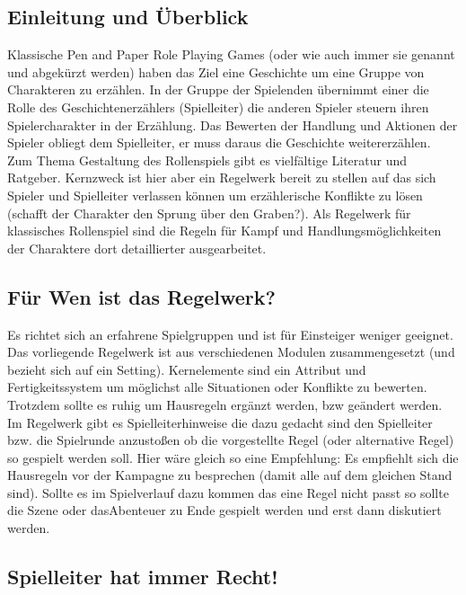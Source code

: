 \documentclass{article}
\begin{document}
\tableofcontents
\newpage
\begin{center}
\section{Einleitung und Überblick}
\end{center}

Klassische Pen and Paper Role Playing Games (oder wie auch immer sie genannt und abgekürzt werden) haben das Ziel
eine Geschichte um eine Gruppe von Charakteren zu erzählen. In der Gruppe der Spielenden übernimmt einer die Rolle
des Geschichtenerzählers (Spielleiter) die anderen Spieler steuern ihren Spielercharakter in der Erzählung. Das
Bewerten der Handlung und Aktionen der Spieler obliegt dem Spielleiter, er muss daraus die Geschichte weitererzählen.
Zum Thema Gestaltung des Rollenspiels gibt es vielfältige Literatur und Ratgeber. Kernzweck ist hier aber
ein Regelwerk bereit zu stellen auf das sich Spieler und Spielleiter verlassen können um erzählerische Konflikte zu
lösen (schafft der Charakter den Sprung über den Graben?). Als Regelwerk für klassisches Rollenspiel sind die Regeln
für Kampf und Handlungsmöglichkeiten der Charaktere dort detaillierter ausgearbeitet.

\begin{center}
\subsection{Für Wen ist das Regelwerk?}
\end{center}

Es richtet sich an erfahrene Spielgruppen und ist für Einsteiger weniger geeignet. Das vorliegende Regelwerk ist aus
verschiedenen Modulen zusammengesetzt (und bezieht sich auf ein Setting). Kernelemente sind ein Attribut und
Fertigkeitssystem um möglichst alle Situationen oder Konflikte zu bewerten. Trotzdem sollte es ruhig um
Hausregeln ergänzt werden, bzw geändert werden. Im Regelwerk gibt es Spielleiterhinweise die dazu gedacht sind den
Spielleiter bzw. die Spielrunde anzustoßen ob die vorgestellte Regel (oder alternative Regel) so gespielt werden soll.
Hier wäre gleich so eine Empfehlung: Es empfiehlt sich die Hausregeln vor der Kampagne zu besprechen (damit alle auf
dem gleichen Stand sind). Sollte es im Spielverlauf dazu kommen das eine Regel nicht passt so sollte die Szene oder
dasAbenteuer zu Ende gespielt werden und erst dann diskutiert werden.

\begin{center}
\subsection{Spielleiter hat immer Recht!}
\end{center}
\end{document}
